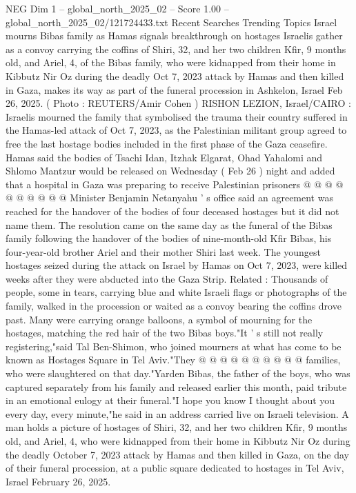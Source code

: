 \begin{textsample}{NEG Dim 1 – global\_north\_2025\_02 – Score 1.00 – global\_north\_2025\_02/121724433.txt}  \label{ex:f1_neg_007}
Recent Searches Trending Topics Israel mourns Bibas family as Hamas signals breakthrough on hostages Israelis gather as a convoy carrying the coffins of Shiri, 32, and her two children Kfir, 9 months old, and Ariel, 4, of the Bibas family, who were kidnapped from their home in Kibbutz Nir Oz during the deadly Oct 7, 2023 attack by Hamas and then killed in Gaza, makes its way as part of the funeral procession in Ashkelon, Israel Feb 26, 2025. ( Photo : REUTERS/Amir Cohen ) RISHON LEZION, Israel/CAIRO : Israelis mourned the family that symbolised the trauma their country suffered in the Hamas-led attack of Oct 7, 2023, as the Palestinian militant group agreed to free the last hostage bodies included in the first phase of the Gaza ceasefire.
Hamas said the bodies of Tsachi Idan, Itzhak Elgarat, Ohad Yahalomi and Shlomo Mantzur would be released on Wednesday ( Feb 26 ) night and added that a hospital in Gaza was preparing to receive Palestinian prisoners @ @ @ @ @ @ @ @ @ @ Minister Benjamin Netanyahu ' s office said an agreement was reached for the handover of the bodies of four deceased hostages but it did not name them.
The resolution came on the same day as the funeral of the Bibas family following the handover of the bodies of nine-month-old Kfir Bibas, his four-year-old brother Ariel and their mother Shiri last week.
The youngest hostages seized during the attack on Israel by Hamas on Oct 7, 2023, were killed weeks after they were abducted into the Gaza Strip.
Related : Thousands of people, some in tears, carrying blue and white Israeli flags or photographs of the family, walked in the procession or waited as a convoy bearing the coffins drove past.
Many were carrying orange balloons, a symbol of mourning for the hostages, matching the red hair of the two Bibas boys."It ' s still not really registering,"said Tal Ben-Shimon, who joined mourners at what has come to be known as Hostages Square in Tel Aviv."They @ @ @ @ @ @ @ @ @ @ families, who were slaughtered on that day."Yarden Bibas, the father of the boys, who was captured separately from his family and released earlier this month, paid tribute in an emotional eulogy at their funeral."I hope you know I thought about you every day, every minute,"he said in an address carried live on Israeli television.
A man holds a picture of hostages of Shiri, 32, and her two children Kfir, 9 months old, and Ariel, 4, who were kidnapped from their home in Kibbutz Nir Oz during the deadly October 7, 2023 attack by Hamas and then killed in Gaza, on the day of their funeral procession, at a public square dedicated to hostages in Tel Aviv, Israel February 26, 2025.

\end{textsample}
